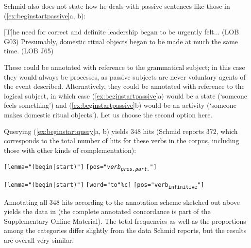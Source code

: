 Schmid also does not state how he deals with passive  sentences like those in (\ref{ex:beginstartpassive}a, b):

\begin{exe}
\ex
\begin{xlist}
\label{ex:beginstartpassive}
\ex $[$T$]$he need for correct and definite leadership began to be urgently felt... (LOB G03)
\ex Presumably, domestic ritual objects began to be made at much the same time. (LOB J65)
\end{xlist}
\end{exe}

These could be annotated  with reference to the grammatical subject; in this case they would always be processes,  as passive  subjects are never voluntary agents  of the event described. Alternatively, they could be annotated with reference to the logical subject, in which case (\ref{ex:beginstartpassive}a) would be a state  (`someone feels something') and (\ref{ex:beginstartpassive}b) would be an activity  (`someone makes domestic ritual objects'). Let us choose the second option here.

Querying (\ref{ex:beginstartquery}a, b) yields 348 hits (Schmid reports 372, which corresponds to the total number of hits for these verbs  in the corpus, including those with other kinds of  complementation):

\begin{exe}
\ex
\begin{xlist}
\label{ex:beginstartquery}
\ex \begin{minipage}[t]{\textwidth} \raggedright \texttt{[lemma="(begin|start)"]} \texttt{[pos="\textit{verb\textsubscript{pres.part.}}"]} \end{minipage}
\ex \begin{minipage}[t]{\textwidth} \raggedright \texttt{[lemma="(begin|start)"]} \texttt{[word="to"\%c]} \texttt{[pos="verb\textsubscript{infinitive}"]} \end{minipage}
\end{xlist}
\end{exe}

Annotating  all 348 hits according to the annotation scheme sketched out above yields the data in  (the complete annotated  concordance  is part of the Supplementary Online Material). The total frequencies  as well as the proportions among the categories  differ slightly from the data Schmid reports, but the results are overall very similar.


